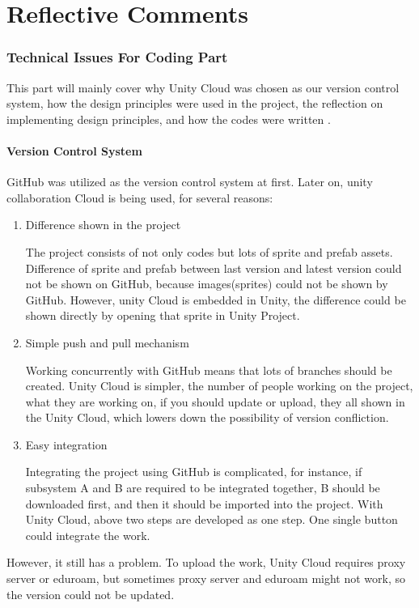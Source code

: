 \documentclass[12pt, a4paper]{report}
\author{Minghao Wang 16522066}
\begin{document}
\part{Reflective Comments}
	\section{Technical Issues For Coding Part}
		This part will mainly cover why Unity Cloud was chosen as our version control system,  how the design principles were used in the project, the reflection on implementing design principles, and how the codes were written .
		\subsection{Version Control System}
			GitHub was utilized as the version control system at first. Later on, unity collaboration Cloud is being used, for several reasons:\\
			\begin{enumerate}
				\item Difference shown in the project

				The project consists of not only codes but lots of sprite and prefab assets. Difference of sprite and prefab between last version and latest version could not be shown on GitHub,  because images(sprites) could not be shown by GitHub. However, unity Cloud is embedded in Unity, the difference could be shown directly by opening that sprite in Unity Project.\\


				\item Simple push and pull mechanism

				Working concurrently with GitHub means that lots of branches should be created. Unity Cloud is simpler, the number of people working on the project, what they are working on, if you should update or upload, they all shown in the Unity Cloud, which lowers down the possibility of version confliction.\\

				\item Easy integration 

				Integrating the project using GitHub is complicated, for instance, if subsystem A and B are required to be integrated together, B should be downloaded first, and then it should be imported into the project. With Unity Cloud, above two steps are developed as one step. One single button could integrate the work. \\
			\end{enumerate}
			However, it still has a problem. To upload the work, Unity Cloud requires proxy server or eduroam, but sometimes proxy server and eduroam might not work, so the version could not be updated.
\end{document}
